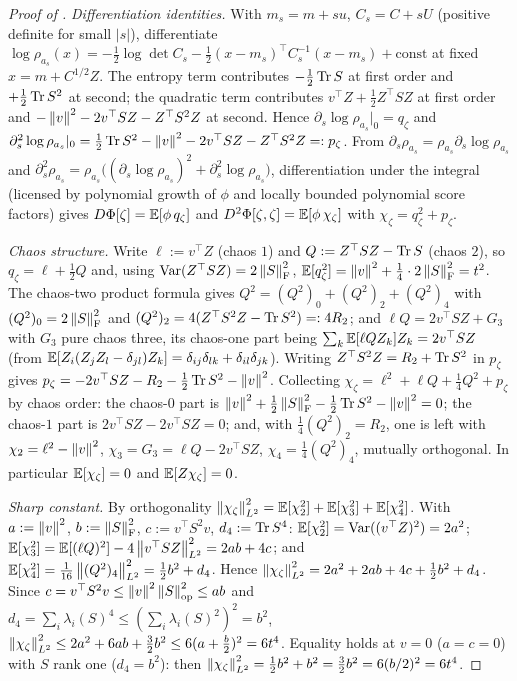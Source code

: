 \begin{proof}[Proof of ]
\emph{Differentiation identities.} With $m_s=m+su$, $C_s=C+sU$ (positive definite for small $|s|$),
differentiate $\log\rho_{a_s}(x)=-\tfrac12\log\det C_s-\tfrac12(x-m_s)^\top C_s^{-1}(x-m_s)+\mathrm{const}$
at fixed $x=m+C^{1/2}Z$. The entropy term contributes $-\tfrac12\operatorname{Tr} S$ at first order and
$+\tfrac12\operatorname{Tr} S^2$ at second; the quadratic term contributes $v^\top Z+\tfrac12Z^\top SZ$ at first order
and $-\left\lVert v\right\rVert^2-2v^\top SZ-Z^\top S^2Z$ at second. Hence $\partial_s\log\rho_{a_s}|_0=q_\zeta$ and
$\partial_s^2\log\rho_{a_s}|_0=\tfrac12\operatorname{Tr} S^2-\left\lVert v\right\rVert^2-2v^\top SZ-Z^\top S^2Z=:p_\zeta$. From
$\partial_s\rho_{a_s}=\rho_{a_s}\partial_s\log\rho_{a_s}$ and
$\partial_s^2\rho_{a_s}=\rho_{a_s}\bigl((\partial_s\log\rho_{a_s})^2+\partial_s^2\log\rho_{a_s}\bigr)$,
differentiation under the integral (licensed by polynomial growth of $\phi$ and locally bounded
polynomial score factors) gives $D\Phi[\zeta]=\mathbb{E}[\phi\,q_\zeta]$ and
$D^2\Phi[\zeta,\zeta]=\mathbb{E}[\phi\,\chi_\zeta]$ with $\chi_\zeta=q_\zeta^2+p_\zeta$.

\emph{Chaos structure.} Write $\ell:=v^\top Z$ (chaos $1$) and $Q:=Z^\top SZ-\operatorname{Tr} S$ (chaos $2$), so
$q_\zeta=\ell+\tfrac12Q$ and, using $\operatorname{Var}(Z^\top SZ)=2\left\lVert S\right\rVert_{\mathrm{F}}^2$,
$\mathbb{E}[q_\zeta^2]=\left\lVert v\right\rVert^2+\tfrac14\cdot2\left\lVert S\right\rVert_{\mathrm{F}}^2=t^2$. The chaos-two product formula gives
$Q^2=(Q^2)_0+(Q^2)_2+(Q^2)_4$ with $(Q^2)_0=2\left\lVert S\right\rVert_{\mathrm{F}}^2$ and $(Q^2)_2=4(Z^\top S^2Z-\operatorname{Tr} S^2)=:4R_2$;
and $\ell Q=2v^\top SZ+G_3$ with $G_3$ pure chaos three, its chaos-one part being
$\sum_k\mathbb{E}[\ell QZ_k]Z_k=2v^\top SZ$ (from $\mathbb{E}[Z_i(Z_jZ_l-\delta_{jl})Z_k]=\delta_{ij}\delta_{lk}+\delta_{il}\delta_{jk}$).
Writing $Z^\top S^2Z=R_2+\operatorname{Tr} S^2$ in $p_\zeta$ gives $p_\zeta=-2v^\top SZ-R_2-\tfrac12\operatorname{Tr} S^2-\left\lVert v\right\rVert^2$.
Collecting $\chi_\zeta=\ell^2+\ell Q+\tfrac14Q^2+p_\zeta$ by chaos order: the chaos-$0$ part is
$\left\lVert v\right\rVert^2+\tfrac12\left\lVert S\right\rVert_{\mathrm{F}}^2-\tfrac12\operatorname{Tr} S^2-\left\lVert v\right\rVert^2=0$; the chaos-$1$ part is
$2v^\top SZ-2v^\top SZ=0$; and, with $\tfrac14(Q^2)_2=R_2$, one is left with
$\chi_2=\ell^2-\left\lVert v\right\rVert^2$, $\chi_3=G_3=\ell Q-2v^\top SZ$, $\chi_4=\tfrac14(Q^2)_4$, mutually
orthogonal. In particular $\mathbb{E}[\chi_\zeta]=0$ and $\mathbb{E}[Z\chi_\zeta]=0$.

\emph{Sharp constant.} By orthogonality $\left\lVert \chi_\zeta\right\rVert_{L^2}^2=\mathbb{E}[\chi_2^2]+\mathbb{E}[\chi_3^2]+\mathbb{E}[\chi_4^2]$.
With $a:=\left\lVert v\right\rVert^2$, $b:=\left\lVert S\right\rVert_{\mathrm{F}}^2$, $c:=v^\top S^2v$, $d_4:=\operatorname{Tr} S^4$: $\mathbb{E}[\chi_2^2]=\operatorname{Var}((v^\top Z)^2)=2a^2$;
$\mathbb{E}[\chi_3^2]=\mathbb{E}[(\ell Q)^2]-4\left\lVert v^\top SZ\right\rVert_{L^2}^2=2ab+4c$; and
$\mathbb{E}[\chi_4^2]=\tfrac1{16}\left\lVert (Q^2)_4\right\rVert_{L^2}^2=\tfrac12b^2+d_4$. Hence
$\left\lVert \chi_\zeta\right\rVert_{L^2}^2=2a^2+2ab+4c+\tfrac12b^2+d_4$. Since $c=v^\top S^2v\leq\left\lVert v\right\rVert^2\left\lVert S\right\rVert_{\mathrm{op}}^2\leq ab$
and $d_4=\sum_i\lambda_i(S)^4\leq(\sum_i\lambda_i(S)^2)^2=b^2$,
$\left\lVert \chi_\zeta\right\rVert_{L^2}^2\leq2a^2+6ab+\tfrac32b^2\leq6(a+\tfrac b2)^2=6t^4$. Equality holds at $v=0$
($a=c=0$) with $S$ rank one ($d_4=b^2$): then $\left\lVert \chi_\zeta\right\rVert_{L^2}^2=\tfrac12b^2+b^2=\tfrac32b^2=6(b/2)^2=6t^4$.
\end{proof}

